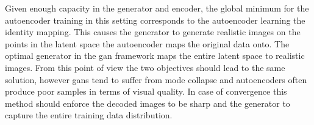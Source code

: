 Given enough capacity in the generator and encoder, the global minimum for the autoencoder training in this setting corresponds to the autoencoder learning the identity mapping. This causes the generator to generate realistic images on the points in the latent space the autoencoder maps the original data onto. The optimal generator in the \acrshort{gan} framework maps the entire latent space to realistic images. From this point of view the two objectives should lead to the same solution, however \acrshort{gans} tend to suffer from mode collapse and autoencoders often produce poor samples in terms of visual quality. In case of convergence this method should enforce the decoded images to be sharp and the generator to capture the entire training data distribution.


